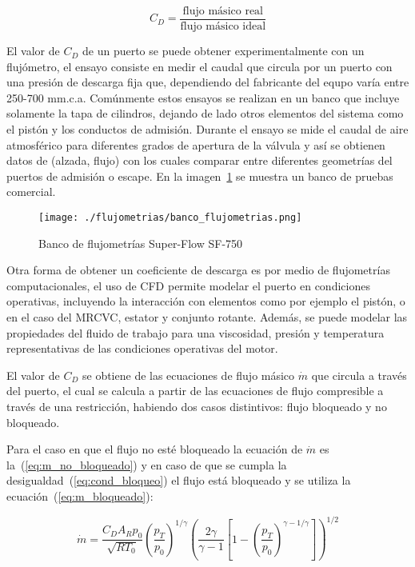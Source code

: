 \begin{equation}
  C_{D} = \frac{\text{flujo másico real}}{\text{flujo másico ideal}}
\end{equation}

El valor de $C_{D}$ de un puerto se puede obtener experimentalmente con un
flujómetro, el ensayo consiste en medir el caudal que circula por un puerto con
una presión de descarga fija que, dependiendo del fabricante del equpo varía
entre 250-700 mm.c.a.
%
Comúnmente estos ensayos se realizan en un banco que incluye solamente la tapa
de cilindros, dejando de lado otros elementos del sistema como el pistón y los
conductos de admisión.
%
Durante el ensayo se mide el caudal de aire atmosférico para diferentes grados
de apertura de la válvula y así se obtienen datos de (alzada, flujo) con los
cuales comparar entre diferentes geometrías del puertos de admisión o escape.
%
En la imagen~\ref{fig:banco_flujometrias} se muestra un banco de pruebas
comercial.


\begin{figure} \centering
\texttt{[image: ./flujometrias/banco\_flujometrias.png]}
  \caption{Banco de flujometrías Super-Flow SF-750}\label{fig:banco_flujometrias}
\end{figure}

Otra forma de obtener un coeficiente de descarga es por medio de flujometrías
computacionales, el uso de CFD permite modelar el puerto en condiciones
operativas, incluyendo la interacción con elementos como por ejemplo el pistón,
o en el caso del MRCVC, estator y conjunto rotante.
%
Además, se puede modelar las propiedades del fluido de trabajo para una
viscosidad, presión y temperatura representativas de las condiciones operativas
del motor.

El valor de $C_{D}$ se obtiene de las ecuaciones de flujo másico $\dot{m}$ que
circula a través del puerto, el cual se calcula a partir de las ecuaciones de
flujo compresible a través de una restricción, habiendo dos casos distintivos:
flujo bloqueado y no bloqueado.

Para el caso en que el flujo no esté bloqueado la ecuación de $\dot{m}$ es
la~(\ref{eq:m_no_bloqueado}) y en caso de que se cumpla la
desigualdad~(\ref{eq:cond_bloqueo}) el flujo está bloqueado y se utiliza la
ecuación~(\ref{eq:m_bloqueado}):
%

\begin{equation}\label{eq:m_no_bloqueado}
  \dot{m} = \frac{C_D A_R p_0}{\sqrt{R T_0}} {\left(\frac{p_T}{p_0} \right)}^{1/\gamma} {\left( \frac{2\gamma}{\gamma-1} \left[1- {(\frac{p_T}{p_0})}^{{\gamma-1}/\gamma} \right] \right)}^{1/2}
\end{equation}

